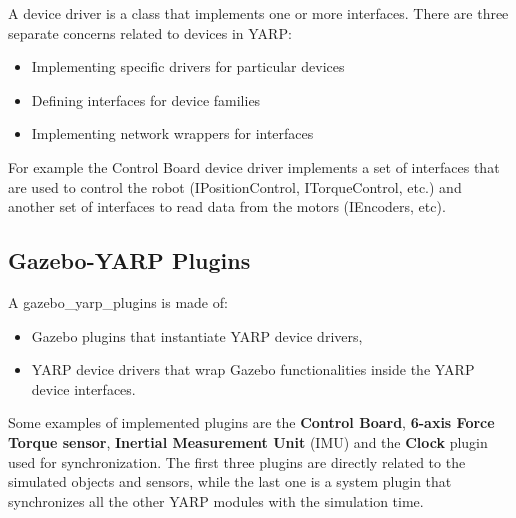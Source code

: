 A device driver is a class that implements one or more interfaces. There are three separate concerns related to devices in YARP:
\begin{itemize}
\item Implementing specific drivers for particular devices
\item Defining interfaces for device families
\item Implementing network wrappers for interfaces
\end{itemize}
For example the Control Board device driver implements a set of interfaces that are used to control the robot (IPositionControl, ITorqueControl, etc.) and another set of interfaces to read data from the motors (IEncoders, etc).

\subsection{Gazebo-YARP Plugins}
A gazebo\_yarp\_plugins is made of:
\begin{itemize}
    \item Gazebo plugins that instantiate YARP device drivers,
    \item YARP device drivers that wrap Gazebo functionalities inside the YARP device interfaces.
\end{itemize}
Some examples of implemented plugins are the \textbf{Control Board}, \textbf{6-axis Force Torque sensor}, \textbf{Inertial Measurement Unit} (IMU) and the \textbf{Clock} plugin used for synchronization.
The first three plugins are directly related to the simulated objects and sensors, while the last one is a system plugin that synchronizes all the other YARP modules with the simulation time. 

